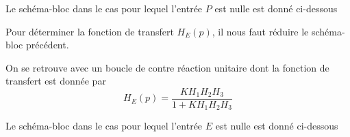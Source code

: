 
Le schéma-bloc dans le cas pour lequel l'entrée $P$ est nulle est donné 
ci-dessous
\begin{center}
    
\end{center}
Pour déterminer la fonction de transfert $H_E(p)$, il nous faut réduire le
schéma-bloc précédent.
\begin{center}
    
\end{center}
On se retrouve avec un boucle de contre réaction unitaire dont la fonction
de transfert est donnée par 
\[
    H_E(p)=\dfrac{KH_1H_2H_3}{1+KH_1H_2H_3}
\]

Le schéma-bloc dans le cas pour lequel l'entrée $E$ est nulle est donné 
ci-dessous
\begin{center}
    
\end{center}

